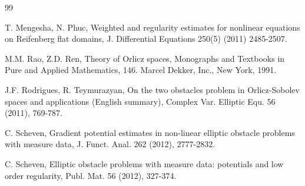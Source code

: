 \documentclass[10pt,a4paper]{article}
\theoremstyle{definition}
\numberwithin{equation}{section}
\begin{document}
\begin{thebibliography}{99}

T. Mengesha, N. Phuc, Weighted and regularity estimates for nonlinear equations
on Reifenberg flat domains, J. Differential Equations 250(5) (2011) 2485-2507.


 

\label{rr28} M.M. Rao, Z.D. Ren, Theory of Orlicz spaces, Monographs and Textbooks in Pure and Applied Mathematics, 146. Marcel Dekker, Inc., New York, 1991.

  J.F. Rodrigues, R. Teymurazyan, On the two obstacles problem in Orlicz-Sobolev spaces and applications (English summary),
Complex Var. Elliptic Equ. 56 (2011), 769-787.




  C. Scheven, Gradient potential estimates in non-linear elliptic obstacle problems with measure data,  J. Funct. Anal. 262 (2012), 2777-2832.

  C. Scheven, Elliptic obstacle problems with measure data: potentials and low order regularity, Publ. Mat. 56 (2012),  327-374.





\end{thebibliography}
\end{document}
